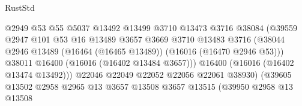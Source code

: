 \begin{lexlean}{RustStd}
\begin{coremodule}
                                            @2949
                                            @53
                                            @55
                                            @5037
                                            @13492
                                            @13499
                                            @3710
                                            @13473
                                            @3716
                                            @38084
                                            (@39559
                                              @2947
                                              @101
                                              @53
                                              @16
                                              @13489
                                              @3657
                                              @3669
                                              @3710
                                              @13483
                                              @3716
                                              (@38044
                                                @2946
                                                @13489
                                                (@16464 (@16465 @13489))
                                                (@16016 (@16470 @2946 @53)))
                                              @38011
                                              @16400
                                              (@16016 (@16402 @13484 @3657)))
                                            @16400
                                            (@16016 (@16402 @13474 @13492)))
                                          @22046
                                          @22049
                                          @22052
                                          @22056
                                          @22061
                                          @38930)
                                        (@39605
                                          @13502
                                          @2958
                                          @2965
                                          @13
                                          @3657
                                          @13508
                                          @3657
                                          @13515
                                          (@39950
                                            @2958
                                            @13
                                            @13508

\end{coremodule}
\end{lexlean}
